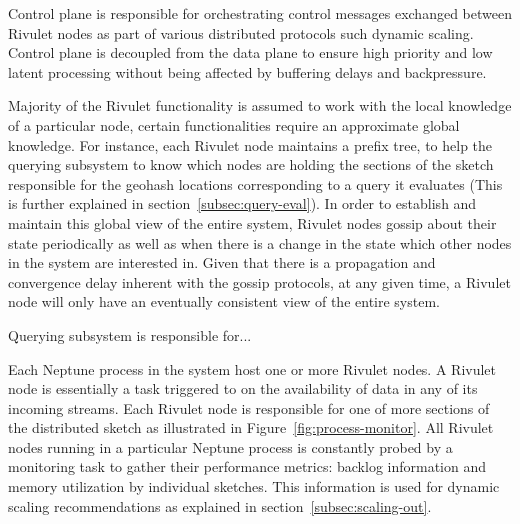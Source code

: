 \begin{description}[leftmargin=*]
	\item[Control plane:] Control plane is responsible for orchestrating control messages exchanged between Rivulet nodes as part of various distributed protocols such dynamic scaling.
	Control plane is decoupled from the data plane to ensure high priority and low latent processing without being affected by buffering delays and backpressure.

	\item[Gossip subsystem:] Majority of the Rivulet functionality is assumed to work with the local knowledge of a particular node, certain functionalities require an approximate global knowledge. 
	For instance, each Rivulet node maintains a prefix tree, to help the querying subsystem to know which nodes are holding the sections of the sketch responsible for the geohash locations corresponding to a query it evaluates (This is further explained in section~\ref{subsec:query-eval}). 
	In order to establish and maintain this global view of the entire system, Rivulet nodes gossip about their state periodically as well as when there is a change in the state which other nodes in the system are interested in.
	Given that there is a propagation and convergence delay inherent with the gossip protocols, at any given time, a Rivulet node will only have an eventually consistent view of the entire system.

	\item[Querying subsystem:] Querying subsystem is responsible for...
\end{description} 

Each Neptune process in the system host one or more Rivulet nodes.
A Rivulet node is essentially a task triggered to on the availability of data in any of its incoming streams.
Each Rivulet node is responsible for one of more sections of the distributed sketch as illustrated in Figure~\ref{fig:process-monitor}.
All Rivulet nodes running in a particular Neptune process is constantly probed by a monitoring task to gather their performance metrics: backlog information and memory utilization by individual sketches.
This information is used for dynamic scaling recommendations as explained in section~\ref{subsec:scaling-out}.

